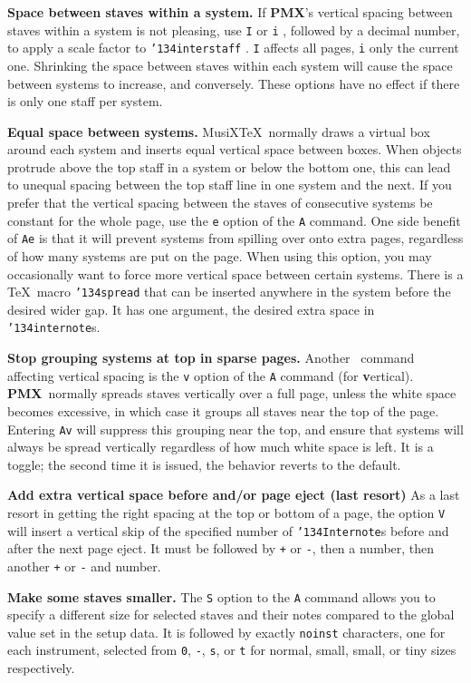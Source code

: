 \documentclass[11pt]{article}
\def\MusiXTeX{MusiX\TeX}
\def\bs{{\tt\char'134}}
\newcommand\PMXX{\textbf{PMX}}
\newcommand\PMX{\PMXX~}
\def\newfrom{2.59}  %
\def\NEW#1{\ifdim#1 pt<\newfrom pt\else%
\marginpar{\fbox{#1}}\fi}
\begin{document}
{\bf Space between staves within a system.}
If \PMXX's vertical spacing between staves within a system is not pleasing, use {\tt I} or
{\tt i} , followed by a decimal number, to apply a scale factor to 
\bs{\tt interstaff} . {\tt I} 
affects all pages, {\tt i} only the current one.  Shrinking the space between
staves within each system will cause the space between systems to increase, and
conversely. These options have no effect if there is only one staff per system.

{\bf Equal space between systems.}
\label{AeDirective}\MusiXTeX~normally draws a virtual box around each system 
and inserts equal vertical space between boxes.  \NEW{2.3} 
When objects protrude above the top staff in a system or 
below the bottom one, this can lead to unequal spacing between the top staff
line in one system and the next.  If you prefer that the vertical spacing
between the staves of consecutive systems be constant for the whole page,
use the {\tt e} option of the {\tt A} command.  One side benefit of {\tt Ae} 
is that it will prevent systems from spilling over onto extra pages, 
regardless of how many systems are put on the page. When using this option, 
you may occasionally want to force more vertical space between certain systems.  
There is a \TeX~macro
{\tt \bs spread} that can be inserted anywhere in the system before the 
desired wider gap.  It has one argument, the desired extra space in
{\tt\bs internote}s. 

{\bf Stop grouping systems at top in sparse pages.}
Another \NEW{2.4}\ command affecting vertical spacing is the {\tt v} 
option of the {\tt A} command (for
{\bf v}ertical). \PMX normally spreads staves 
vertically over a full page, unless the white space becomes excessive,
in which case it groups all staves near the top of the page.  Entering
{\tt Av} will suppress this grouping near the top, and ensure that
systems will always be spread vertically regardless of how much white
space is left.  It is a toggle; the second time it is issued, the 
behavior reverts to the default.

{\bf Add extra vertical space before and/or page eject (last resort)}\NEW{2.8}
As a last resort in getting the right spacing at the top or bottom of a page, 
the option {\tt V} will insert a vertical skip of the specified number of 
{\tt \bs Internote}s before and after the next page eject. It must be followed by
{\tt +} or {\tt -}, then a number, then another {\tt +} or {\tt -} and number. 

{\bf Make some staves smaller.}
The {\tt S} 
option to the {\tt A} command\NEW{2.7} allows you to specify a 
different size for selected staves and their notes compared to the 
global value set in the setup data. It is followed by exactly {\tt noinst} 
characters, one for each instrument, selected from 
{\tt 0}, {\tt -}, {\tt s}, or {\tt t} for 
normal, small, small, or tiny sizes respectively. 
\end{document}
